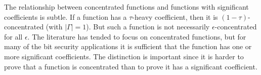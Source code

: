 \documentclass[11pt]{article}
\theoremstyle{definition}
\begin{document}
The relationship between concentrated functions and functions with significant coefficients is subtle.
If a function has a $\tau$-heavy coefficient, then it is $(1-\tau)$-concentrated (with $|\Gamma|=1$). But such a function is not necessarily $\epsilon$-concentrated for all $\epsilon$.
The literature has tended to focus on concentrated functions, but for many of the bit security applications it is sufficient that the function has one or more significant coefficients.
The distinction is important since it is harder to prove that a function is concentrated than to prove it has a significant coefficient.
\end{document}
